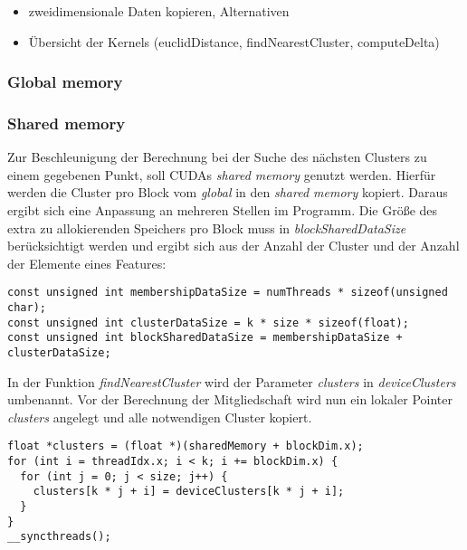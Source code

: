 \begin{itemize}
	\item zweidimensionale Daten kopieren, Alternativen
	\item Übersicht der Kernels (euclidDistance, findNearestCluster, computeDelta)
\end{itemize}

\subsubsection{Global memory}


\subsubsection{Shared memory}

Zur Beschleunigung der Berechnung bei der Suche des nächsten Clusters zu einem gegebenen Punkt, soll CUDAs \textit{shared memory} genutzt werden. Hierfür werden die Cluster pro Block vom \textit{global} in den \textit{shared memory} kopiert. Daraus ergibt sich eine Anpassung an mehreren Stellen im Programm. Die Größe des extra zu allokierenden Speichers pro Block muss in \textit{blockSharedDataSize} berücksichtigt werden und ergibt sich aus der Anzahl der Cluster und der Anzahl der Elemente eines Features:

\lstset{language=C}
\begin{lstlisting}
const unsigned int membershipDataSize = numThreads * sizeof(unsigned char);
const unsigned int clusterDataSize = k * size * sizeof(float);
const unsigned int blockSharedDataSize = membershipDataSize + clusterDataSize;
\end{lstlisting}

In der Funktion \textit{findNearestCluster} wird der Parameter \textit{clusters} in \textit{deviceClusters} umbenannt. Vor der Berechnung der Mitgliedschaft wird nun ein lokaler Pointer \textit{clusters} angelegt und alle notwendigen Cluster kopiert.

\lstset{language=C}
\begin{lstlisting}
float *clusters = (float *)(sharedMemory + blockDim.x);
for (int i = threadIdx.x; i < k; i += blockDim.x) {
  for (int j = 0; j < size; j++) {
    clusters[k * j + i] = deviceClusters[k * j + i];
  }
}
__syncthreads();
\end{lstlisting}

